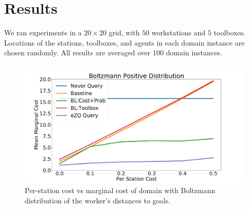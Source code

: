 \documentclass[letterpaper]{article}
\begin{document}







\section{Results}
We ran experiments in a $20\times 20$ grid, with $50$ workstations and $5$ toolboxes. Locations of the stations, toolboxes, and agents in each domain instance are chosen randomly. All results are averaged over $100$ domain instances.



\begin{figure}[t]
    \centering
    \includegraphics[width=\linewidth]{Figures/CAT_AAAI_BoltzmannPositive.pdf}
    \vspace{-5mm}
    \caption{Per-station cost vs marginal cost of domain with Boltzmann distribution of the worker's distances to goals.}
    \label{fig:dist}
\end{figure}
\end{document}
